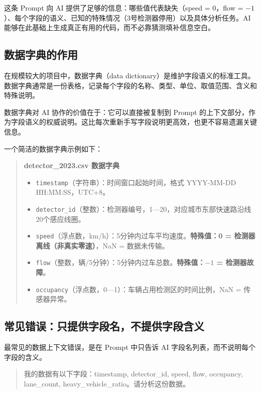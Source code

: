 这条 Prompt 向 AI 提供了足够的信息：哪些值代表缺失（speed = 0，flow = $-1$）、每个字段的语义、已知的特殊情况（3号检测器停用）以及具体分析任务。AI 能够在此基础上生成真正有用的代码，而不必靠猜测填补信息空白。

\subsection{数据字典的作用}

在规模较大的项目中，数据字典（data dictionary）是维护字段语义的标准工具。数据字典通常是一份表格，记录每个字段的名称、类型、单位、取值范围、含义和特殊说明。

数据字典对 AI 协作的价值在于：它可以直接被复制到 Prompt 的上下文部分，作为字段语义的权威说明。这比每次重新手写字段说明更高效，也更不容易遗漏关键信息。

一个简洁的数据字典示例如下：

\begin{quote}
\textbf{detector\_2023.csv 数据字典}

\begin{itemize}
  \item \texttt{timestamp}（字符串）：时间窗口起始时间，格式 YYYY-MM-DD HH:MM:SS，UTC+8。
  \item \texttt{detector\_id}（整数）：检测器编号，1—20，对应城市东部快速路沿线20个感应线圈。
  \item \texttt{speed}（浮点数，km/h）：5分钟内过车平均速度。\textbf{特殊值：0 = 检测器离线（非真实零速）}，NaN = 数据未传输。
  \item \texttt{flow}（整数，辆/5分钟）：5分钟内过车总数。\textbf{特殊值：$-1$ = 检测器故障}。
  \item \texttt{occupancy}（浮点数，0—1）：车辆占用检测区的时间比例，NaN = 传感器异常。
\end{itemize}
\end{quote}

\subsection{常见错误：只提供字段名，不提供字段含义}

最常见的数据上下文错误，是在 Prompt 中只告诉 AI 字段名列表，而不说明每个字段的含义。

\begin{quote}
我的数据有以下字段：timestamp, detector\_id, speed, flow, occupancy, lane\_count, heavy\_vehicle\_ratio。请分析这份数据。
\end{quote}


